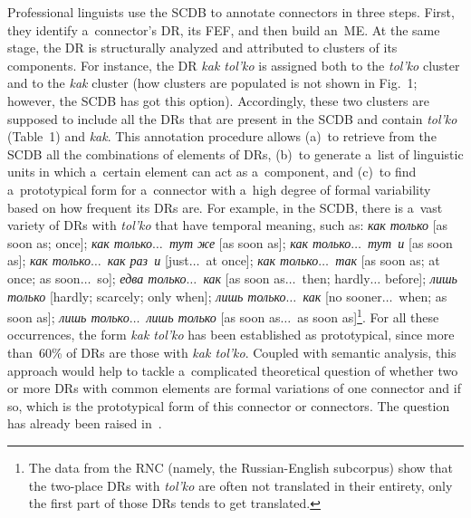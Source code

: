 \begin{multicols}{2}

  Professional linguists use the SCDB to annotate connectors in three steps. First, 
they identify a~connector's DR, its FEF, and then build an~ME. At the same stage, %
the DR is structurally analyzed and attributed to clusters of its components. For 
instance, the DR \textit{kak tol'ko} is assigned both to the \textit{tol'ko} cluster 
and to the \textit{kak} cluster (how clusters are populated is not shown in Fig.~1; 
however, the SCDB has got this option). Accordingly, these two clusters are 
supposed to include all the DRs that are present in the SCDB and contain 
\textit{tol'ko} (Table~1) and \textit{kak}. This annotation procedure allows 
(a)~to retrieve from the SCDB all the combinations of elements of DRs, (b)~to 
generate a~list of linguistic units in which a~certain element can act as a~component, 
and (c)~to find a~prototypical form for a~connector with a~high degree of formal 
variability based on how frequent its DRs are. For example, in the SCDB, there is 
a~vast variety of DRs with \textit{tol'ko} that have temporal meaning, such as: 
\textit{как только} [as soon as; once]; \textit{как только$\ldots$\ тут же} [as 
soon as]; \textit{как только$\ldots$\  тут~и} [as soon as]; \textit{как только$\ldots$\  
как раз~и} [just$\ldots$\  at once]; \textit{как только$\ldots$\  
так} [as soon as; at once; as soon$\ldots$\  so]; \textit{едва только$\ldots$\  как} 
[as soon as$\ldots$\  then; hardly$\ldots$ before]; \textit{лишь
только} [hardly; 
scarcely; only when]; \textit{лишь только$\ldots$\ как} [no sooner$\ldots$\  
when; as soon as]; \textit{лишь только$\ldots$\ лишь только} [as soon 
as$\ldots$\  as soon as]\footnote{The data from the RNC (namely, the Russian-English 
subcorpus) show that the two-place DRs with \textit{tol'ko} are often not translated in their entirety, only 
the first part of those DRs tends to get translated.}. For all these occurrences, the form 
\textit{kak tol'ko} has been established as prototypical, since more than~60\% of 
DRs are those with \textit{kak tol'ko}. Coupled with semantic analysis, this 
approach would help to tackle a~complicated theoretical question of whether two or 
more DRs with common elements are formal variations of one connector and if so, 
which is the prototypical form of this connector or connectors. The question has 
already been raised in~\cite{12-in, 13-in, 14-in}.
  

\end{multicols}
